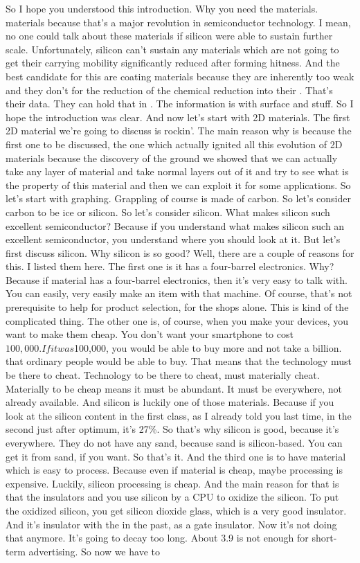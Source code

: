 So I hope you understood this introduction. Why you need the materials. materials because that's a major revolution in semiconductor technology. I mean, no one could talk about these materials if silicon were able to sustain further scale. Unfortunately, silicon can't sustain any materials which are not going to get their carrying mobility significantly reduced after forming hitness. And the best candidate for this are coating materials because they are inherently too weak and they don't for the reduction of the chemical reduction into their . That's their data. They can hold that in . The information is with surface and stuff. So I hope the introduction was clear. And now let's start with 2D materials. The first 2D material we're going to discuss is rockin'. The main reason why is because the first one to be discussed, the one which actually ignited all this evolution of 2D materials because the discovery of the ground we showed that we can actually take any layer of material and take normal layers out of it and try to see what is the property of this material and then we can exploit it for some applications. So let's start with graphing. Grappling of course is made of carbon. So let's consider carbon to be ice or silicon. So let's consider silicon. What makes silicon such excellent semiconductor? Because if you understand what makes silicon such an excellent semiconductor, you understand where you should look at it. But let's first discuss silicon. Why silicon is so good? Well, there are a couple of reasons for this. I listed them here. The first one is it has a four-barrel electronics. Why? Because if material has a four-barrel electronics, then it's very easy to talk with. You can easily, very easily make an item with that machine. Of course, that's not prerequisite to help for product selection, for the shops alone. This is kind of the complicated thing. The other one is, of course, when you make your devices, you want to make them cheap. You don't want your smartphone to cost $100,000. If it was $100,000, you would be able to buy more and not take a billion. that ordinary people would be able to buy. That means that the technology must be there to cheat. Technology to be there to cheat, must materially cheat. Materially to be cheap means it must be abundant. It must be everywhere, not already available. And silicon is luckily one of those materials. Because if you look at the silicon content in the first class, as I already told you last time, in the second just after optimum, it's 27\%. So that's why silicon is good, because it's everywhere. They do not have any sand, because sand is silicon-based. You can get it from sand, if you want. So that's it. And the third one is to have material which is easy to process. Because even if material is cheap, maybe processing is expensive. Luckily, silicon processing is cheap. And the main reason for that is that the insulators and you use silicon by a CPU to oxidize the silicon. To put the oxidized silicon, you get silicon dioxide glass, which is a very good insulator. And it's insulator with the in the past, as a gate insulator. Now it's not doing that anymore. It's going to decay too long. About 3.9 is not enough for short-term advertising. So now we have to 